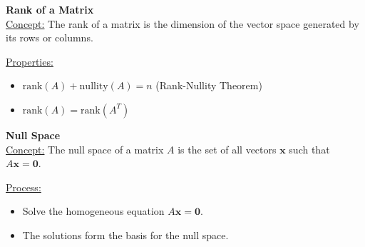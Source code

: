 \documentclass[8pt, a4paper, landscape]{extarticle} %
\begin{document}
\begin{multicols*}{4}
  \textbf{Rank of a Matrix}\\
  \underline{Concept:} The rank of a matrix is the dimension of the vector space generated by its rows or columns.

  \underline{Properties:}
  \begin{itemize}
    \item \(\text{rank}(A) + \text{nullity}(A) = n\) (Rank-Nullity Theorem)
    \item \(\text{rank}(A) = \text{rank}(A^T)\)
  \end{itemize}
  \textbf{Null Space}\\
  \underline{Concept:} The null space of a matrix \( A \) is the set of all vectors \( \mathbf{x} \) such that \( A\mathbf{x} = \mathbf{0} \).

  \underline{Process:}
  \begin{itemize}
    \item Solve the homogeneous equation \( A\mathbf{x} = \mathbf{0} \).
    \item The solutions form the basis for the null space.
  \end{itemize}

\end{multicols*}
\end{document}
